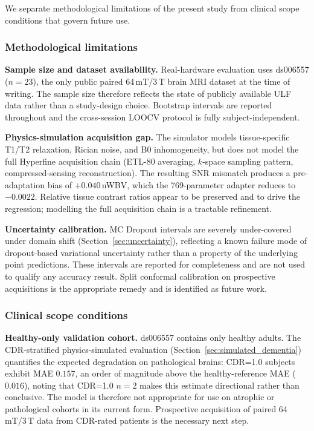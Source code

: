 \documentclass[12pt,a4paper]{article}
\begin{document}
We separate methodological limitations of the present study from
clinical scope conditions that govern future use.

\subsubsection*{Methodological limitations}

\textbf{Sample size and dataset availability.}
Real-hardware evaluation uses ds006557 ($n = 23$), the only public
paired 64\,mT/3\,T brain MRI dataset at the time of writing. The
sample size therefore reflects the state of publicly available ULF
data rather than a study-design choice. Bootstrap intervals are
reported throughout and the cross-session LOOCV protocol is fully
subject-independent.

\textbf{Physics-simulation acquisition gap.}
The simulator models tissue-specific T1/T2 relaxation, Rician noise,
and B0 inhomogeneity, but does not model the full Hyperfine
acquisition chain (ETL-80 averaging, $k$-space sampling pattern,
compressed-sensing reconstruction). The resulting SNR mismatch
produces a pre-adaptation bias of $+0.040$\,nWBV, which the
769-parameter adapter reduces to $-0.0022$. Relative tissue contrast
ratios appear to be preserved and to drive the regression; modelling
the full acquisition chain is a tractable refinement.

\textbf{Uncertainty calibration.}
MC Dropout intervals are severely under-covered under domain shift
(Section~\ref{sec:uncertainty}), reflecting a known failure mode of
dropout-based variational uncertainty rather than a property of the
underlying point predictions. These intervals are reported for
completeness and are not used to qualify any accuracy result. Split
conformal calibration on prospective acquisitions is the appropriate
remedy and is identified as future work.

\subsubsection*{Clinical scope conditions}

\textbf{Healthy-only validation cohort.}
ds006557 contains only healthy adults. The CDR-stratified
physics-simulated evaluation (Section~\ref{sec:simulated_dementia})
quantifies the expected degradation on pathological brains: CDR=1.0
subjects exhibit MAE $0.157$, an order of magnitude above the
healthy-reference MAE ($0.016$), noting that CDR=1.0 $n=2$ makes
this estimate directional rather than conclusive. The model is
therefore not appropriate for use on atrophic or pathological cohorts
in its current form. Prospective acquisition of paired 64\,mT/3\,T
data from CDR-rated patients is the necessary next step.
\end{document}
